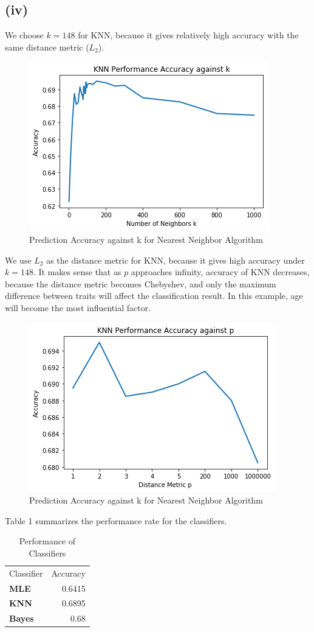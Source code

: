 \documentclass[twoside,11pt]{homework}
\begin{document}
\subsection*{(iv)}  
	We choose $k=148$ for KNN, because it gives relatively high accuracy with the same distance metric ($L_2$).
	\begin{figure}[H]
		\centering
		\includegraphics[scale=.5]{q5_fig/performance_vs_k.png}	
		\caption{Prediction Accuracy against k for Nearest Neighbor Algorithm}
	\end{figure}
	We use $L_2$ as the distance metric for KNN, because it gives high accuracy under $k=148$. 
	It makes sense that as $p$ approaches infinity, accuracy of KNN decreases, 
	because the distance metric becomes Chebyshev, and only the maximum difference between traits will affect the classification result.
	In this example, age will become the most influential factor.
	\begin{figure}[H]
		\centering
		\includegraphics[scale=.5]{q5_fig/performance_vs_p.png}	
		\caption{Prediction Accuracy against k for Nearest Neighbor Algorithm}
	\end{figure}
	Table 1 summarizes the performance rate for the classifiers.
	\begin{table}[H]
	\centering
	\caption{Performance of Classifiers}
	\begin{tabular}{lr}
		Classifier   & Accuracy \\
		\textbf{MLE}   & 0.6415    \\
		\textbf{KNN}   & 0.6895        \\
		\textbf{Bayes} & 0.68
	\end{tabular}
	\end{table}
	
\end{document}
